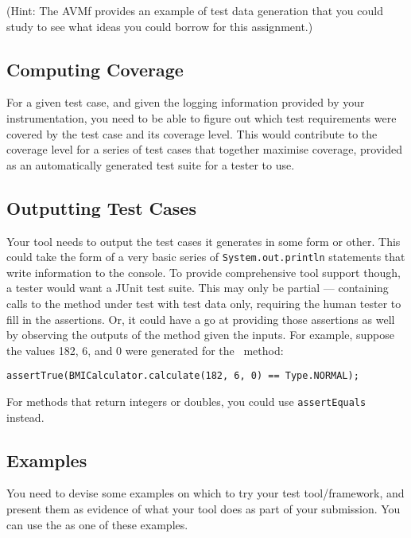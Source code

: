 (Hint: The AVMf provides an example of test data generation that you could study
to see what ideas you could borrow for this assignment.)


\subsection{Computing Coverage}

For a given test case, and given the logging information provided by your
instrumentation, you need to be able to figure out which test requirements were
covered by the test case and its coverage level. This would contribute to the
coverage level for a series of test cases that together maximise coverage,
provided as an automatically generated test suite for a tester to use.


\subsection{Outputting Test Cases}

Your tool needs to output the test cases it generates in some form or other.
This could take the form of a very basic series of {\tt System.out.println}
statements that write information to the console. To provide comprehensive tool
support though, a tester would want a JUnit test suite. This may only be partial
--- containing calls to the method under test with test data only, requiring the
human tester to fill in the assertions. Or, it could have a go at providing
those assertions as well by observing the outputs of the method given the
inputs. For example, suppose the values 182, 6, and 0 were generated for the
\calculatemethod~method:

\begin{center}
{\tt \scriptsize assertTrue(BMICalculator.calculate(182, 6, 0) == Type.NORMAL);}
\end{center}

For methods that return integers or doubles, you could use {\tt assertEquals} instead.

\subsection{Examples}

You need to devise some examples on which to try your test tool/framework, and
present them as evidence of what your tool does as part of your submission. You
can use the \bmicalculatorclass as one of these examples. 

